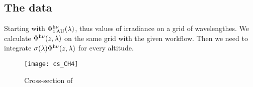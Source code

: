 \subsection{The data}

Starting with $\Phi^{\mathrm{h}\nu}_\text{1\,AU}(\lambda)$, thus values of
irradiance on a grid of wavelengthes. We calculate
$\Phi^{\mathrm{h}\nu}(z,\lambda)$ on the same grid with the given
workflow. Then we need to integrate $\sigma(\lambda)\Phi^{\mathrm{h}\nu}(z,\lambda)$
for every altitude.

\begin{figure}
\centering
\texttt{[image: cs\_CH4]}
\caption{\label{csCH4}Cross-section of }
\end{figure}


